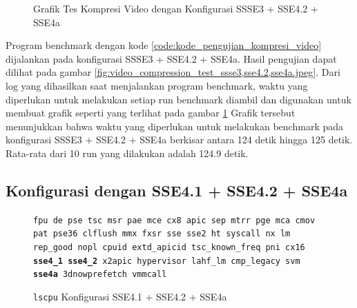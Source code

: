 \begin{figure}
    \centering
    \caption{Grafik Tes Kompresi Video dengan Konfigurasi SSSE3 + SSE4.2 + SSE4a}
    \label{fig:video_compression_test_ssse3,sse4.2,sse4a_graph}
\end{figure}

Program benchmark dengan kode \ref{code:kode_pengujian_kompresi_video} dijalankan pada konfigurasi SSSE3 + SSE4.2 + SSE4a. Hasil pengujian dapat dilihat pada gambar \ref{fig:video_compression_test_ssse3,sse4.2,sse4a.jpeg}. Dari log yang dihasilkan saat menjalankan program benchmark, waktu yang diperlukan untuk melakukan setiap run benchmark diambil dan digunakan untuk membuat grafik seperti yang terlihat pada gambar \ref{fig:video_compression_test_ssse3,sse4.2,sse4a_graph} Grafik tersebut menunjukkan bahwa waktu yang diperlukan untuk melakukan benchmark pada konfigurasi SSSE3 + SSE4.2 + SSE4a berkisar antara 124 detik hingga 125 detik. Rata-rata dari 10 run yang dilakukan adalah 124.9 detik.
\subsection{Konfigurasi dengan SSE4.1 + SSE4.2 + SSE4a}
\begin{figure}
    \texttt{fpu de pse tsc msr pae mce cx8 apic sep mtrr pge mca cmov pat pse36 clflush mmx fxsr sse sse2 ht syscall nx lm rep\_good nopl cpuid extd\_apicid tsc\_known\_freq pni cx16 \textbf{sse4\_1} \textbf{sse4\_2} x2apic hypervisor lahf\_lm cmp\_legacy svm \textbf{sse4a} 3dnowprefetch vmmcall}
    \caption{\texttt{lscpu} Konfigurasi SSE4.1 + SSE4.2 + SSE4a}
    \label{fig:lscpu_video_compression_test_sse4.1,sse4.2,sse4a.jpeg}
\end{figure}

